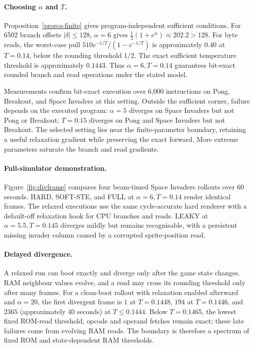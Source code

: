 \documentclass[letterpaper]{article} %
\begin{document}
\paragraph{Choosing $\alpha$ and $T$.}
Proposition~\ref{prop:s-finite} gives
program-independent sufficient conditions.
For 6502 branch offsets $|\delta|\le128$,
$\alpha=6$ gives
$\tfrac12(1+e^\alpha)\approx202.2>128$.
For byte reads, the worst-case pull
$510e^{-1/T}/(1-e^{-1/T})$ is approximately
$0.40$ at $T=0.14$, below the rounding
threshold $1/2$. The exact sufficient
temperature threshold is approximately $0.1443$.
Thus $\alpha=6,T=0.14$ guarantees
bit-exact rounded branch and read operations
under the stated model.

Measurements confirm bit-exact execution over
6,000 instructions on Pong, Breakout, and
Space Invaders at this setting. Outside the
sufficient corner, failure depends on the
executed program: $\alpha=5$ diverges on
Space Invaders but not Pong or Breakout;
$T=0.15$ diverges on Pong and Space Invaders
but not Breakout. The selected setting lies
near the finite-parameter boundary, retaining
a useful relaxation gradient while preserving
the exact forward. More extreme parameters
saturate the branch and read gradients.

\paragraph{Full-simulator demonstration.}
Figure~\ref{fig:divframe} compares four
beam-timed Space Invaders rollouts over 60 seconds.
HARD, SOFT-STE, and FULL at $\alpha=6,T=0.14$
render identical frames. The relaxed executions
use the same cycle-accurate hard renderer with
a default-off relaxation hook for CPU branches
and reads. LEAKY at $\alpha=5.5,T=0.145$
diverges mildly but remains recognisable,
with a persistent missing invader column
caused by a corrupted sprite-position read.

\paragraph{Delayed divergence.}
A relaxed run can boot exactly and diverge only
after the game state changes. RAM neighbour
values evolve, and a read may cross its
rounding threshold only after many frames.
For a clean-boot rollout with relaxation
enabled afterward and $\alpha=20$,
the first divergent frame is $1$ at
$T=0.1448$, $194$ at $T=0.1446$, and
$2365$ (approximately 40 seconds) at
$T\le0.1444$. Below $T=0.1465$, the
lowest fixed ROM-read threshold, opcode and
operand fetches remain exact; these late
failures come from evolving RAM reads.
The boundary is therefore a spectrum of
fixed ROM and state-dependent RAM thresholds.
\end{document}
